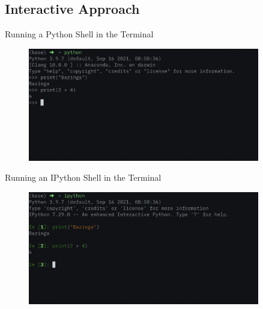 \documentclass[aspectratio=1610]{beamer}
\begin{document}
\subsection{Interactive Approach}

\begin{frame}{Running a Python Shell in the Terminal}
		\begin{figure}
			\includegraphics[width=0.9\textwidth]{images/python_session}
		\end{figure}
\end{frame}

\begin{frame}{Running an IPython Shell in the Terminal}
		\begin{figure}
			\includegraphics[width=0.9\textwidth]{images/ipython_session}
		\end{figure}
\end{frame}
\end{document}
